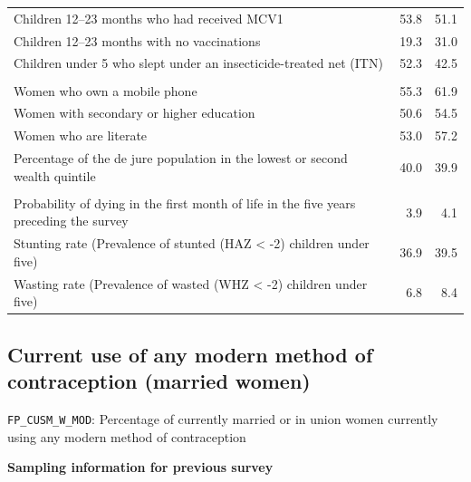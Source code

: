 \documentclass[
]{article}
\begin{document}
\begin{table}[!h]
\begin{tabular}[t]{lrr}
\hspace{1em}Children 12–23 months who had received MCV1 & 53.8 & 51.1\\
\hspace{1em}Children 12–23 months with no vaccinations & 19.3 & 31.0\\
\hspace{1em}Children under 5 who slept under an insecticide-treated net (ITN) & 52.3 & 42.5\\
\addlinespace[0.3em]
\multicolumn{3}{l}{\textbf{Social Determinants}}\\
\hspace{1em}Women who own a mobile phone & 55.3 & 61.9\\
\hspace{1em}Women with secondary or higher education & 50.6 & 54.5\\
\hspace{1em}Women who are literate & 53.0 & 57.2\\
\hspace{1em}Percentage of the de jure population in the lowest or second wealth quintile & 40.0 & 39.9\\
\addlinespace[0.3em]
\multicolumn{3}{l}{\textbf{Health Outcomes}}\\
\hspace{1em}Probability of dying in the first month of life in the five years preceding the survey & 3.9 & 4.1\\
\hspace{1em}Stunting rate (Prevalence of stunted (HAZ < -2) children under five) & 36.9 & 39.5\\
\hspace{1em}Wasting rate (Prevalence of wasted (WHZ < -2) children under five) & 6.8 & 8.4\\
\bottomrule
\end{tabular}
\end{table}

\newpage

\subsection{Current use of any modern method of contraception (married women)}\label{current-use-of-any-modern-method-of-contraception-married-women}

\texttt{FP\_CUSM\_W\_MOD}: Percentage of currently married or in union women currently using any modern method of contraception

\textbf{Sampling information for previous survey}
\end{document}
